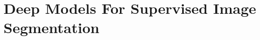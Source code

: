 \documentclass[./dissertation.tex]{subfiles}
\begin{document}
\chapter{Deep Models For Supervised Image Segmentation}
\label{ch:toxo}

\end{document}
